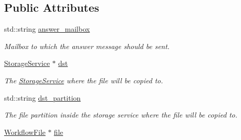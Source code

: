 \subsection*{Public Attributes}
\begin{DoxyCompactItemize}
\item 
\mbox{\label{classwrench_1_1_storage_service_file_copy_request_message_ab1062525b524093b703452a431ef0019}} 
std\+::string \hyperlink{classwrench_1_1_storage_service_file_copy_request_message_ab1062525b524093b703452a431ef0019}{answer\+\_\+mailbox}
\begin{DoxyCompactList}\small\item\em Mailbox to which the answer message should be sent. \end{DoxyCompactList}\item 
\mbox{\label{classwrench_1_1_storage_service_file_copy_request_message_a0fd53a56604107eea13d884fb69c0551}} 
\hyperlink{classwrench_1_1_storage_service}{Storage\+Service} $\ast$ \hyperlink{classwrench_1_1_storage_service_file_copy_request_message_a0fd53a56604107eea13d884fb69c0551}{dst}
\begin{DoxyCompactList}\small\item\em The \hyperlink{classwrench_1_1_storage_service}{Storage\+Service} where the file will be copied to. \end{DoxyCompactList}\item 
\mbox{\label{classwrench_1_1_storage_service_file_copy_request_message_ac0d61c47bd3c2f06949cd8c304bb151a}} 
std\+::string \hyperlink{classwrench_1_1_storage_service_file_copy_request_message_ac0d61c47bd3c2f06949cd8c304bb151a}{dst\+\_\+partition}
\begin{DoxyCompactList}\small\item\em The file partition inside the storage service where the file will be copied to. \end{DoxyCompactList}\item 
\mbox{\label{classwrench_1_1_storage_service_file_copy_request_message_a53ba2a2bfb7ef65aff0902bee08f5076}} 
\hyperlink{classwrench_1_1_workflow_file}{Workflow\+File} $\ast$ \hyperlink{classwrench_1_1_storage_service_file_copy_request_message_a53ba2a2bfb7ef65aff0902bee08f5076}{file}

\end{DoxyCompactItemize}
